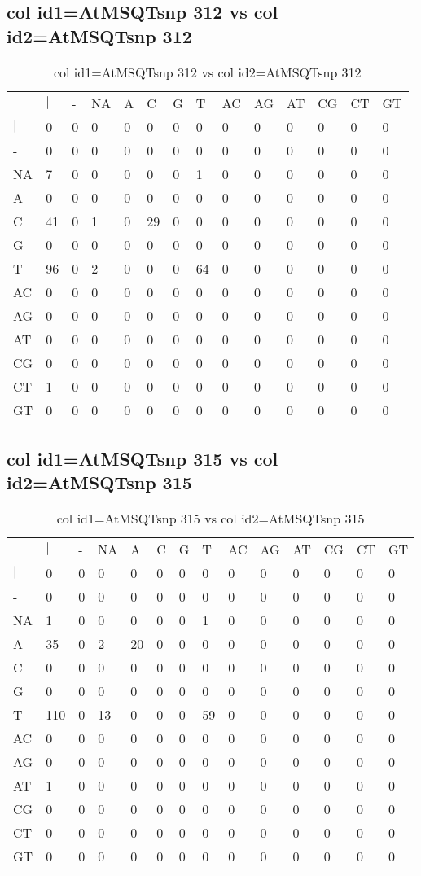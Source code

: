 \subsection{col id1=AtMSQTsnp 312 vs col id2=AtMSQTsnp 312}
\begin{center}
\begin{longtable}{|l|l|l|l|l|l|l|l|l|l|l|l|l|l|}
\caption{col id1=AtMSQTsnp 312 vs col id2=AtMSQTsnp 312} \label{table_dm650}\\
\hline
\\
\hline
&$|$&-&NA&A&C&G&T&AC&AG&AT&CG&CT&GT\\
$|$&0&0&0&0&0&0&0&0&0&0&0&0&0\\
-&0&0&0&0&0&0&0&0&0&0&0&0&0\\
NA&7&0&0&0&0&0&1&0&0&0&0&0&0\\
A&0&0&0&0&0&0&0&0&0&0&0&0&0\\
C&41&0&1&0&29&0&0&0&0&0&0&0&0\\
G&0&0&0&0&0&0&0&0&0&0&0&0&0\\
T&96&0&2&0&0&0&64&0&0&0&0&0&0\\
AC&0&0&0&0&0&0&0&0&0&0&0&0&0\\
AG&0&0&0&0&0&0&0&0&0&0&0&0&0\\
AT&0&0&0&0&0&0&0&0&0&0&0&0&0\\
CG&0&0&0&0&0&0&0&0&0&0&0&0&0\\
CT&1&0&0&0&0&0&0&0&0&0&0&0&0\\
GT&0&0&0&0&0&0&0&0&0&0&0&0&0\\
\hline
\end{longtable}
\end{center}

\subsection{col id1=AtMSQTsnp 315 vs col id2=AtMSQTsnp 315}
\begin{center}
\begin{longtable}{|l|l|l|l|l|l|l|l|l|l|l|l|l|l|}
\caption{col id1=AtMSQTsnp 315 vs col id2=AtMSQTsnp 315} \label{table_dm652}\\
\hline
\\
\hline
&$|$&-&NA&A&C&G&T&AC&AG&AT&CG&CT&GT\\
$|$&0&0&0&0&0&0&0&0&0&0&0&0&0\\
-&0&0&0&0&0&0&0&0&0&0&0&0&0\\
NA&1&0&0&0&0&0&1&0&0&0&0&0&0\\
A&35&0&2&20&0&0&0&0&0&0&0&0&0\\
C&0&0&0&0&0&0&0&0&0&0&0&0&0\\
G&0&0&0&0&0&0&0&0&0&0&0&0&0\\
T&110&0&13&0&0&0&59&0&0&0&0&0&0\\
AC&0&0&0&0&0&0&0&0&0&0&0&0&0\\
AG&0&0&0&0&0&0&0&0&0&0&0&0&0\\
AT&1&0&0&0&0&0&0&0&0&0&0&0&0\\
CG&0&0&0&0&0&0&0&0&0&0&0&0&0\\
CT&0&0&0&0&0&0&0&0&0&0&0&0&0\\
GT&0&0&0&0&0&0&0&0&0&0&0&0&0\\
\hline
\end{longtable}
\end{center}

